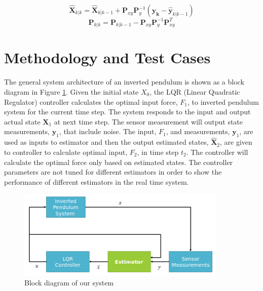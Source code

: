 \documentclass{article}
\newcommand{\matr}[1]{\bm{#1}}     %
\begin{document}
\begin{equation}
	\hat{\matr{X}}_{k|k} = 	\hat{\matr{X}}_{k|k-1} + \matr{P}_{xy} \matr{P}^{-1}_{y}(\matr{y_k}-\hat{\matr{y}}_{k|k-1})
\label{eq:UKF5}
\end{equation}
\begin{equation}
	\matr{P}_{k|k}=	\matr{P}_{k|k-1} - \matr{P}_{xy}\matr{P}^{-1}_{y}\matr{P}_{xy}^T
\label{eq:UKF6}
\end{equation}
\section{Methodology and Test Cases} 
The general system architecture of an inverted pendulum is shown as a block diagram in Figure \ref{fig:block_diagram}. Given the initial state $X_0$, the LQR (Linear Quadratic Regulator) controller  calculates the optimal input force, $F_1$, to inverted pendulum system for the current time step. The system responds to the input and output actual state $\matr{X}_1$ at next time step. The sensor measurement will output state measurements, $\matr{y}_1$, that include noise. The input, $F_1$, and measurements, $\matr{y}_1$, are used as inputs to estimator and then the output estimated states, $\matr{\hat{X}}_2$, are given to controller to calculate optimal input, $F_2$, in time step $t_2$.  The controller will calculate the optimal force only based on estimated states. The controller parameters are not tuned for different estimators in order to show the performance of different estimators in the real time system. 
\begin{figure}[h!]
	\centering
	\includegraphics[width=10cm,keepaspectratio]{SystemArchitecture.png}
	\caption{Block diagram of our system}
	\label{fig:block_diagram}
\end{figure}
\end{document}
